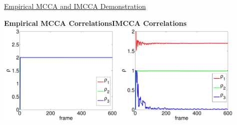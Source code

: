 \documentclass[8pt]{beamer}
\begin{document}
\begin{frame}{\href{run:/home/asendorf/Documents/thesis_videos/mcca_flashing.mp4}{Empirical
      MCCA and
      IMCCA Demonstration}} 

    \begin{center}
      \hspace{-3ex}\textbf{Empirical MCCA Correlations}\hspace{13ex}\textbf{IMCCA Correlations}
        \includegraphics[width=0.45\textwidth]{figures/mcca_cca_corrs.pdf}\hspace{2ex}
        \includegraphics[width=0.45\textwidth]{figures/mcca_icca_corrs.pdf}
    \end{center}

\end{frame}
\end{document}
